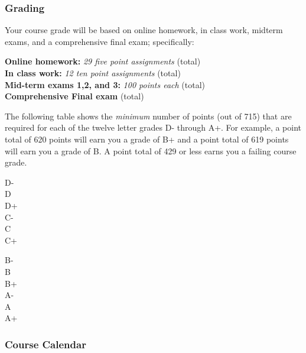 \documentclass[12pt]{article}
\newcounter{ex}\setcounter{ex}{0}
\newenvironment{mypar}[2]
  {\begin{list}{}%
    {\setlength\leftmargin{#1}
    \setlength\rightmargin{#2}}
    \item[]}
  {\end{list}}
\begin{document}
\subsubsection*{Grading}

Your course grade will be based on online homework, in class work, midterm exams, and a comprehensive 
final exam; specifically:
\begin{mypar}{0.25in}{0.25in}
    \textbf{Online homework:} \emph{29 five point assignments}  (total)\\
    \textbf{In class work:}  \emph{12 ten point assignments}   (total) \\
    \textbf{Mid-term exams 1,2, and 3:} \emph{100 points each}  (total)\\
      \textbf{Comprehensive Final exam}  (total)\\
\end{mypar}
\noindent The following table shows the \emph{minimum} number of points (out of 715) that
are required for each of the twelve letter grades D- through A+. For
example, a point total of 620 points will earn you a grade of B+ and 
a point total of 619 points will earn you a grade of B. A point
total of 429 or less earns you a failing course grade.
\begin{mypar}{0.25in}{0.25in}
    \begin{minipage}{2.5in}
        D-    \\
        D  \\
        D+  \\
        C-  \\
        C  \\
        C+  
    \end{minipage}
    \phantom{xxx}
    \begin{minipage}{2.5in}
        B-  \\
        B  \\
        B+  \\
        A-   \\
        A  \\
        A+  
    \end{minipage}
\end{mypar} 

\subsubsection*{Course Calendar}
\end{document}
